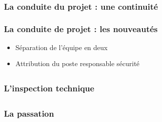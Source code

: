 \speaker{\Sergi{}}
\subsection{} %

\begin{frame}
\frametitle{La conduite du projet : une continuité}
\end{frame}

\begin{frame}
\frametitle{La conduite de projet : les nouveautés}
\begin{itemize}
	\item Séparation de l'équipe en deux
	\item Attribution du poste responsable sécurité
\end{itemize}

\end{frame}

\subsection{}
\begin{frame}
\frametitle{L'inspection technique}
\end{frame}

\subsection{}
\begin{frame}
\frametitle{La passation}
\end{frame}




